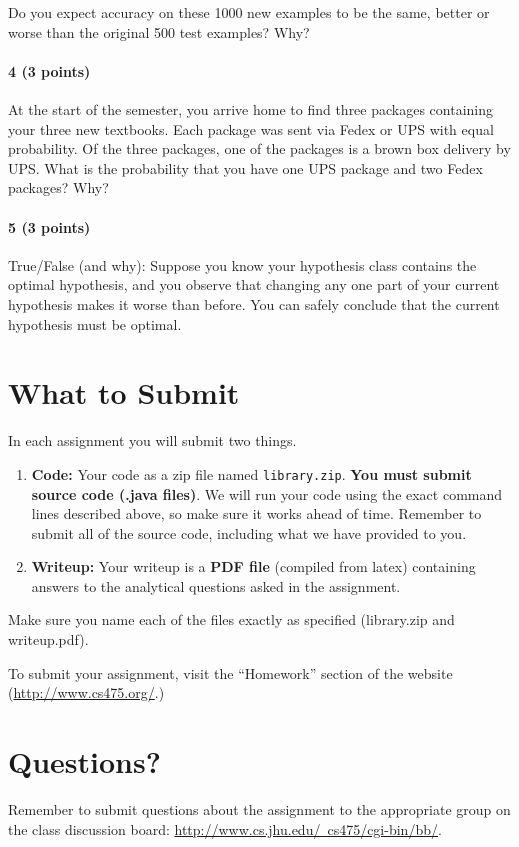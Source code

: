 \documentclass[11pt]{article}
\begin{document}
Do you expect accuracy on these 1000 new examples to be the same, better or worse than the original 500 test examples? Why?

\paragraph{4 (3 points)} At the start of the semester, you arrive home to find three packages containing your three new textbooks. Each package was sent via Fedex or UPS with equal probability. Of the three packages, one of the packages is a brown box delivery by UPS. What is 
the probability that you have one UPS package and two Fedex packages? Why?

\paragraph{5 (3 points)} 
True/False (and why): Suppose you know your hypothesis class contains the optimal hypothesis, and you observe that changing any one part of your current hypothesis makes it worse than before. You can safely conclude that the current hypothesis must be optimal.


\section{What to Submit}
In each assignment you will submit two things.
\begin{enumerate}
\item {\bf Code:} Your code as a zip file named {\tt library.zip}. {\bf You must submit source code (.java files)}. We will run your code using the exact command lines described above, so make sure it works ahead of time. Remember to submit all of the source code, including what we have provided to you.
\item {\bf Writeup:} Your writeup is a {\bf PDF file} (compiled from latex) containing answers to the analytical questions asked in the assignment.
\end{enumerate}
Make sure you name each of the files exactly as specified (library.zip and writeup.pdf).

To submit your assignment, visit the ``Homework'' section of the website (\href{http://www.cs475.org/}{http://www.cs475.org/}.)

\section{Questions?}
Remember to submit questions about the assignment to the appropriate group on the class discussion board: \href{http://www.cs.jhu.edu/~cs475/cgi-bin/bb/}{http://www.cs.jhu.edu/~cs475/cgi-bin/bb/}.
\end{document}
